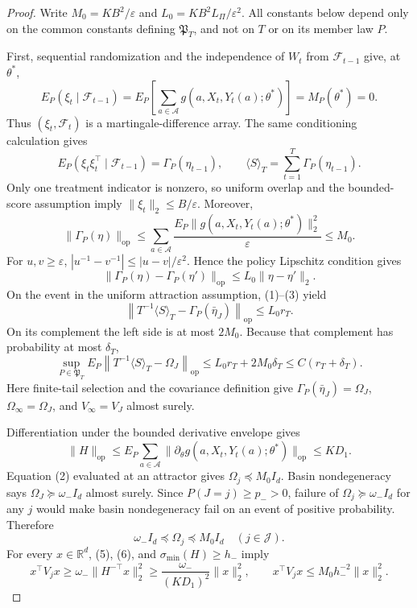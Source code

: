 \documentclass{article}
\begin{document}
\begin{proof}
Write \(M_0=KB^2/\varepsilon\) and \(L_0=KB^2L_\Pi/\varepsilon^2\).  All constants below depend only on the common constants defining \(\mathfrak P_T\), and not on \(T\) or on its member law \(P\).

First, sequential randomization and the independence of \(W_t\) from \(\mathcal F_{t-1}\) give, at \(\theta^*\),
\[
 E_P(\xi_t\mid\mathcal F_{t-1})
 =E_P\!\left[\sum_{a\in\mathcal A}g(a,X_t,Y_t(a);\theta^*)\right]
 =M_P(\theta^*)=0.
\]
Thus \((\xi_t,\mathcal F_t)\) is a martingale-difference array.  The same conditioning calculation gives
\[
 E_P(\xi_t\xi_t^\top\mid\mathcal F_{t-1})
 =\Gamma_P(\eta_{t-1}),
 \qquad
 \langle S\rangle_T=\sum_{t=1}^T\Gamma_P(\eta_{t-1}).                                    \tag{1}
\]
Only one treatment indicator is nonzero, so uniform overlap and the bounded-score assumption imply \(\|\xi_t\|_2\le B/\varepsilon\).  Moreover,
\[
 \|\Gamma_P(\eta)\|_{\mathrm{op}}
 \le \sum_{a\in\mathcal A}\frac{E_P\|g(a,X_t,Y_t(a);\theta^*)\|_2^2}{\varepsilon}
 \le M_0.                                                                  \tag{2}
\]
For \(u,v\ge\varepsilon\), \(|u^{-1}-v^{-1}|\le |u-v|/\varepsilon^2\).  Hence the policy Lipschitz condition gives
\[
 \|\Gamma_P(\eta)-\Gamma_P(\eta')\|_{\mathrm{op}}
 \le L_0\|\eta-\eta'\|_2.                                                \tag{3}
\]
On the event in the uniform attraction assumption, (1)--(3) yield
\[
 \left\|T^{-1}\langle S\rangle_T-\Gamma_P(\bar\eta_J)\right\|_{\mathrm{op}}
 \le L_0r_T.
\]
On its complement the left side is at most \(2M_0\).  Because that complement has probability at most \(\delta_T\),
\[
 \sup_{P\in\mathfrak P_T}E_P\left\|T^{-1}\langle S\rangle_T-\Omega_J\right\|_{\mathrm{op}}
 \le L_0r_T+2M_0\delta_T\le C(r_T+\delta_T).                              \tag{4}
\]
Here finite-tail selection and the covariance definition give \(\Gamma_P(\bar\eta_J)=\Omega_J\), \(\Omega_\infty=\Omega_J\), and \(V_\infty=V_J\) almost surely.

Differentiation under the bounded derivative envelope gives
\[
 \|H\|_{\mathrm{op}}
 \le E_P\sum_{a\in\mathcal A}\|\partial_\theta g(a,X_t,Y_t(a);\theta^*)\|_{\mathrm{op}}
 \le KD_1.                                                                 \tag{5}
\]
Equation (2) evaluated at an attractor gives \(\Omega_j\preceq M_0I_d\).  Basin nondegeneracy says \(\Omega_J\succeq\omega_-I_d\) almost surely.  Since \(P(J=j)\ge p_->0\), failure of \(\Omega_j\succeq\omega_-I_d\) for any \(j\) would make basin nondegeneracy fail on an event of positive probability.  Therefore
\[
 \omega_-I_d\preceq\Omega_j\preceq M_0I_d\quad(j\in\mathcal J).          \tag{6}
\]
For every \(x\in\mathbb R^d\), (5), (6), and \(\sigma_{\min}(H)\ge h_-\) imply
\[
 x^\top V_jx\ge\omega_-\|H^{-\top}x\|_2^2
 \ge\frac{\omega_-}{(KD_1)^2}\|x\|_2^2,
 \qquad
 x^\top V_jx\le M_0h_-^{-2}\|x\|_2^2.                                  \tag{7}
\]


\end{proof}
\end{document}
